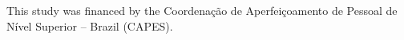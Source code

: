 \documentclass[english]{textolivre}
\begin{document}
\begingroup
\linespread{0.95}\selectfont
\printbibliography\label{sec-bib}
\endgroup


\begin{dataavailability}
\end{dataavailability}

\begin{funding}
This study was financed by the Coordenação de Aperfeiçoamento de Pessoal de Nível Superior – Brazil (CAPES).
\end{funding}
\end{document}
